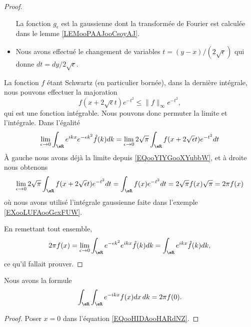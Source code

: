 \begin{proof}
\begin{itemize}
           La fonction \( g_{\epsilon}\) est la gaussienne dont la transformée de Fourier est calculée dans le lemme \ref{LEMooPAAJooCsoyAJ}.
       \item
           Nous avons effectué le changement de variables \( t=(y-x)/(2\sqrt{ \epsilon })\) qui donne \( dt=dy/2\sqrt{ \epsilon }\).
    \end{itemize}
    La fonction \( f\) étant Schwartz (en particulier bornée), dans la dernière intégrale, nous pouvons effectuer la majoration
    \begin{equation}
        f(x+2\sqrt{ \epsilon }t) e^{-t^2}\leq \| f \|_{\infty} e^{-t^2},
    \end{equation}
    qui est une fonction intégrable. Nous pouvons donc permuter la limite et l'intégrale. Dans l'égalité
    \begin{equation}
        \lim_{\epsilon\to 0}\int_{\eR} e^{ikx} e^{-\epsilon k^2}\hat f(k)dk =\lim_{\epsilon\to 0} 2\sqrt{ \pi }\int_{\eR}f(x+2\sqrt{ \epsilon }t) e^{-t^2}dt
    \end{equation}
    À gauche nous avons déjà la limite depuis \eqref{EQooYIYGooXYubbW}, et à droite nous obtenons
    \begin{equation}
        \lim_{\epsilon\to 0} 2\sqrt{ \pi }\int_{\eR}f(x+2\sqrt{ \epsilon }t) e^{-t^2}dt=\int_{\eR}f(x) e^{-t^2}dt=2\sqrt{ \pi }f(x)\sqrt{ \pi }=2\pi f(x)
    \end{equation}
    où nous avons utilisé l'intégrale gaussienne faite dans l'exemple \ref{EXooLUFAooGcxFUW}.
    
    En remettant tout ensemble,
    \begin{equation}
        2\pi f(x)=\lim_{\epsilon\to 0}\int_{\eR} e^{-\epsilon k^2} e^{ikx}\hat f(k)dk=\int_{\eR} e^{ikx}\hat f(k)dk,
    \end{equation}
    ce qu'il fallait prouver.
\end{proof}

\begin{corollary}       \label{CORooAZLZooSviTej}
    Nous avons la formule
    \begin{equation}        \label{EQooRJXRooElEMAa}
        \int_{\eR}\int_{\eR} e^{-ikx}f(x)dx\,dk=2\pi f(0).
    \end{equation}
\end{corollary}

\begin{proof}
    Poser \( x=0\) dans l'équation \eqref{EQooHIDAooHARdNZ}.
\end{proof}

